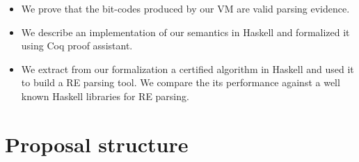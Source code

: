 \documentclass[oneside,12pt]{scrbook}
\theoremstyle{definition}
\theoremstyle{plain}
\theoremstyle{definition}
\begin{document}
\begin{itemize}
	\item We prove that the bit-codes produced by our VM are valid parsing evidence.
	\item We describe an implementation of our semantics in Haskell and formalized it using Coq proof assistant. %
	\item We extract from our formalization a certified algorithm in Haskell and used it	to build a RE parsing tool. We compare the its performance against a well known Haskell libraries for RE parsing. 

\end{itemize}

\section{Proposal structure}\label{section:proposal}
\end{document}
